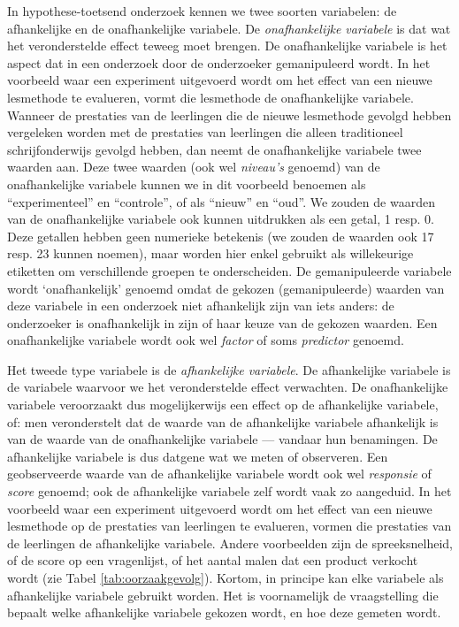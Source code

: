 \documentclass[
]{book}
\begin{document}
In hypothese-toetsend onderzoek kennen we twee soorten variabelen: de
afhankelijke en de onafhankelijke variabele. De \emph{onafhankelijke
variabele} is dat wat het veronderstelde effect teweeg moet brengen. De
onafhankelijke variabele is het aspect dat in een onderzoek door de
onderzoeker gemanipuleerd wordt. In het voorbeeld waar een experiment
uitgevoerd wordt om het effect van een nieuwe lesmethode te evalueren,
vormt die lesmethode de onafhankelijke variabele. Wanneer de prestaties
van de leerlingen die de nieuwe lesmethode gevolgd hebben vergeleken
worden met de prestaties van leerlingen die alleen traditioneel
schrijfonderwijs gevolgd hebben, dan neemt de onafhankelijke variabele
twee waarden aan. Deze twee waarden (ook wel \emph{niveau's} genoemd) van de
onafhankelijke variabele kunnen we in dit voorbeeld benoemen als
``experimenteel'' en ``controle'', of als ``nieuw'' en ``oud''. We zouden de
waarden van de onafhankelijke variabele ook kunnen uitdrukken als een
getal, 1 resp. 0. Deze getallen hebben geen numerieke betekenis (we
zouden de waarden ook 17 resp. 23 kunnen noemen), maar worden hier enkel
gebruikt als willekeurige etiketten om verschillende groepen te
onderscheiden. De gemanipuleerde variabele wordt `onafhankelijk' genoemd
omdat de gekozen (gemanipuleerde) waarden van deze variabele in een
onderzoek niet afhankelijk zijn van iets anders: de onderzoeker is
onafhankelijk in zijn of haar keuze van de gekozen waarden. Een
onafhankelijke variabele wordt ook wel \emph{factor} of soms \emph{predictor}
genoemd.

Het tweede type variabele is de \emph{afhankelijke variabele}. De
afhankelijke variabele is de variabele waarvoor we het veronderstelde
effect verwachten. De onafhankelijke variabele veroorzaakt dus
mogelijkerwijs een effect op de afhankelijke variabele, of: men
veronderstelt dat de waarde van de afhankelijke variabele afhankelijk is
van de waarde van de onafhankelijke variabele --- vandaar hun
benamingen. De afhankelijke variabele is dus datgene wat we meten of
observeren. Een geobserveerde waarde van de afhankelijke variabele wordt
ook wel \emph{responsie} of \emph{score} genoemd; ook de afhankelijke variabele
zelf wordt vaak zo aangeduid. In het voorbeeld waar een experiment
uitgevoerd wordt om het effect van een nieuwe lesmethode op de
prestaties van leerlingen te evalueren, vormen die prestaties van de
leerlingen de afhankelijke variabele. Andere voorbeelden zijn de
spreeksnelheid, of de score op een vragenlijst, of het aantal malen dat
een product verkocht wordt (zie Tabel \ref{tab:oorzaakgevolg}).
Kortom, in principe kan elke variabele
als afhankelijke variabele gebruikt worden. Het is voornamelijk de
vraagstelling die bepaalt welke afhankelijke variabele gekozen wordt, en
hoe deze gemeten wordt.
\end{document}
